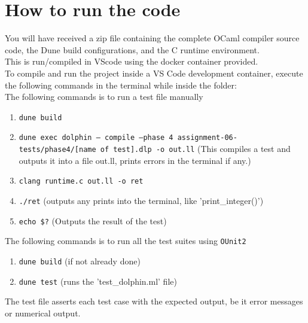 \documentclass[12pt]{article}
\begin{document}
\section*{How to run the code}
You will have received a zip file containing the complete OCaml compiler source code, the Dune build configurations, and the C runtime environment.\\
\newline
This is run/compiled in VScode using the docker container provided.\\
To compile and run the project inside a VS Code development container, execute the following commands in the terminal while inside the folder:\\
The following commands is to run a test file manually
\begin{enumerate}
    \item \texttt{dune build}
    \item \texttt{dune exec dolphin -- compile --phase 4 assignment-06-tests/phase4/[name of test].dlp -o out.ll} (This compiles a test and outputs it into a file out.ll, prints errors in the terminal if any.)
    \item \texttt{clang runtime.c out.ll -o ret}
    \item \texttt{./ret} (outputs any prints into the terminal, like 'print\_integer()')
    \item \texttt{echo \$?} (Outputs the result of the test)
\end{enumerate}
The following commands is to run all the test suites using \texttt{OUnit2}
\begin{enumerate}
    \item \texttt{dune build} (if not already done)
    \item \texttt{dune test} (runs the 'test\_dolphin.ml' file)
\end{enumerate}
The test file asserts each test case with the expected output, be it error messages or numerical output.
\end{document}
